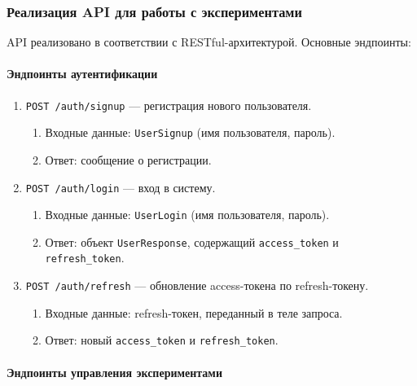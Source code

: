 \subsubsection{Реализация API для работы с экспериментами}

API реализовано в соответствии с RESTful-архитектурой. Основные эндпоинты:

\paragraph{Эндпоинты аутентификации}

\begin{enumerate}
    \item \texttt{POST /auth/signup} — регистрация нового пользователя.
    \begin{enumerate}[label=\arabic{enumi}.\arabic*.]
        \item Входные данные: \texttt{UserSignup} (имя пользователя, пароль).
        \item Ответ: сообщение о регистрации.
    \end{enumerate}

    \item \texttt{POST /auth/login} — вход в систему.
    \begin{enumerate}[label=\arabic{enumi}.\arabic*.]
        \item Входные данные: \texttt{UserLogin} (имя пользователя, пароль).
        \item Ответ: объект \texttt{UserResponse}, содержащий \texttt{access\_token} и \texttt{refresh\_token}.
    \end{enumerate}

    \item \texttt{POST /auth/refresh} — обновление access-токена по refresh-токену.
    \begin{enumerate}[label=\arabic{enumi}.\arabic*.]
        \item Входные данные: refresh-токен, переданный в теле запроса.
        \item Ответ: новый \texttt{access\_token} и \texttt{refresh\_token}.
    \end{enumerate}
\end{enumerate}

\paragraph{Эндпоинты управления экспериментами}

